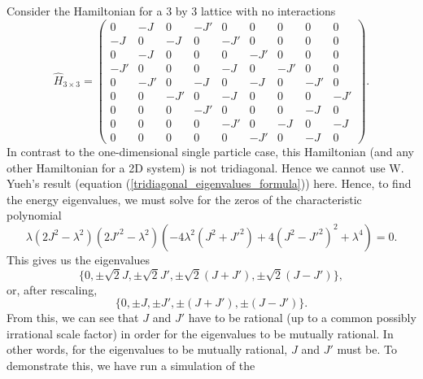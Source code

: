 \documentclass[a4paper, 10pt, draft]{article}
\theoremstyle{plain}
\begin{document}
Consider the Hamiltonian for a $3$ by $3$ lattice with no interactions
\begin{equation}
    \hat{H}_{3\times3}
    =
    \begin{pmatrix}
         0  & -J  &  0  & -J' &  0  &  0  &  0  &  0  &  0  \\
        -J  &  0  & -J  &  0  & -J' &  0  &  0  &  0  &  0  \\
         0  & -J  &  0  &  0  &  0  & -J' &  0  &  0  &  0  \\
        -J' &  0  &  0  &  0  & -J  &  0  & -J' &  0  &  0  \\
         0  & -J' &  0  & -J  &  0  & -J  &  0  & -J' &  0  \\
         0  &  0  & -J' &  0  & -J  &  0  &  0  &  0  & -J' \\
         0  &  0  &  0  & -J' &  0  &  0  &  0  & -J  &  0  \\
         0  &  0  &  0  &  0  & -J' &  0  & -J  &  0  & -J  \\
         0  &  0  &  0  &  0  &  0  & -J' &  0  & -J  &  0
    \end{pmatrix}.
\end{equation}
In contrast to the one-dimensional single particle case, this Hamiltonian (and
any other Hamiltonian for a 2D system) is not tridiagonal. Hence we cannot use
W. Yueh's result (equation (\ref{tridiagonal_eigenvalues_formula})) here.
Hence, to find the energy eigenvalues, we must solve for the zeros of the
characteristic polynomial
\begin{equation}
    \lambda \left ( 2 J^{2} - \lambda^{2} \right )
    \left ( 2 J'^{2} - \lambda^{2} \right )
    \left ( -4 \lambda^{2} \left ( J^{2} + J'^{2} \right )
    +
    4 \left ( J^{2} - J'^{2} \right )^{2}
    +
    \lambda^{4} \right )
    =
    0.
\end{equation}
This gives us the eigenvalues
\begin{equation*}
    \lbrace
        0, \pm\sqrt{2}J, \pm\sqrt{2}J', \pm \sqrt{2}(J+J'), \pm \sqrt{2}(J-J')
    \rbrace,
\end{equation*}
or, after rescaling,
\begin{equation*}
    \lbrace 0, \pm J, \pm J', \pm (J+J'), \pm (J-J') \rbrace.
\end{equation*}
From this, we can see that $J$ and $J'$ have to be rational (up to a common
possibly irrational scale factor) in order for the eigenvalues to be mutually
rational. In other words, for the eigenvalues to be mutually rational,
$J$ and $J'$ must be. To demonstrate this, we have run a simulation of the
\end{document}
